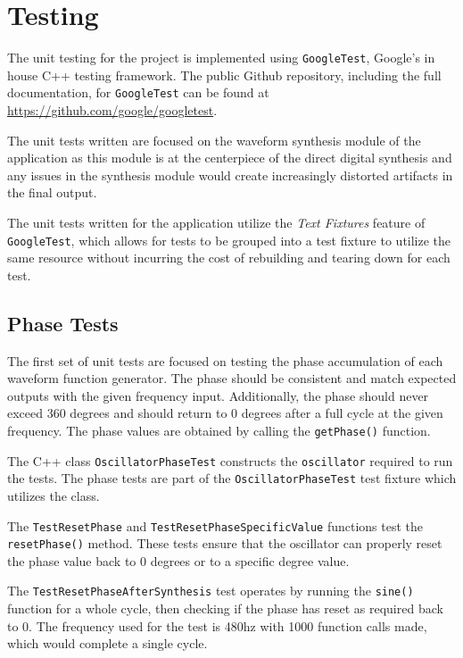 \documentclass[a4paper,12pt]{report}
\begin{document}
\section{Testing}
The unit testing for the project is implemented using \texttt{GoogleTest}, Google's in house C++ testing framework. The public Github repository, including the full documentation, for \texttt{GoogleTest} can be found at \href{https://github.com/google/googletest}{https://github.com/google/googletest}.

The unit tests written are focused on the waveform synthesis module of the application as this module is at the centerpiece of the direct digital synthesis and any issues in the synthesis module would create increasingly distorted artifacts in the final output.

The unit tests written for the application utilize the \emph{Text Fixtures} feature of \texttt{GoogleTest}, which allows for tests to be grouped into a test fixture to utilize the same resource without incurring the cost of rebuilding and tearing down for each test. 

\subsection{Phase Tests}
The first set of unit tests are focused on testing the phase accumulation of each waveform function generator. The phase should be consistent and match expected outputs with the given frequency input. Additionally, the phase should never exceed 360 degrees and should return to 0 degrees after a full cycle at the given frequency. The phase values are obtained by calling the \texttt{getPhase()} function.

The C++ class \texttt{OscillatorPhaseTest} constructs the \texttt{oscillator} required to run the tests. The phase tests are part of the \texttt{OscillatorPhaseTest} test fixture which utilizes the class.

The \texttt{TestResetPhase} and \texttt{TestResetPhaseSpecificValue} functions test the \texttt{resetPhase()} method. These tests ensure that the oscillator can properly reset the phase value back to 0 degrees or to a specific degree value.

The \texttt{TestResetPhaseAfterSynthesis} test operates by running the \texttt{sine()} function for a whole cycle, then checking if the phase has reset as required back to 0. The frequency used for the test is 480hz with 1000 function calls made, which would complete a single cycle.
\end{document}
